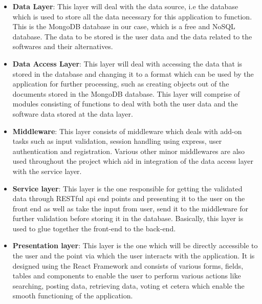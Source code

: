 \begin{itemize}
\item \textbf{Data Layer}: This layer will deal with the data source, i.e the database which is used to store all the data necessary for this application to function. This is the MongoDB database in our case, which is a free and NoSQL database. The data to be stored is the user data and the data related to the softwares and their alternatives.

\item \textbf{Data Access Layer}: This layer will deal with accessing the data that is stored in the database and changing it to a format which can be used by the application for further processing, such as creating objects out of the documents stored in the MongoDB database. This layer will comprise of modules consisting of functions to deal with both the user data and the software data stored at the data layer.

\item \textbf{Middleware}: This layer consists of middleware which deals with add-on tasks such as input validation, session handling using express, user authentication and registration. Various other minor middlewares are also used throughout the project which aid in integration of the data access layer with the service layer.

\item \textbf{Service layer}: This layer is the one responsible for getting the validated data through RESTful api end points and presenting it to the user on the front end as well as take the input from user, send it to the middleware for further validation before storing it in the database. Basically, this layer is used to glue together the front-end to the back-end.

\item \textbf{Presentation layer}: This layer is the one which will be directly accessible to the user and the point via which the user interacts with the application. It is designed using the React Framework and consists of various forms, fields, tables  and components to enable the user to perform various actions like searching, posting data, retrieving data, voting et cetera which enable the smooth functioning of the application.

\end{itemize}
    
